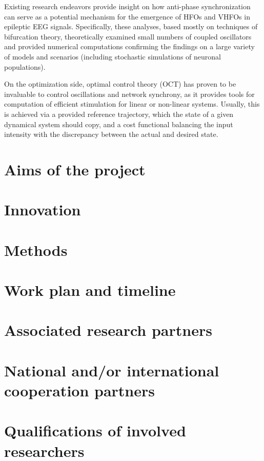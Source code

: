 \documentclass[a4paper,11pt]{scrartcl}
\begin{document}
Existing research endeavors provide insight on how anti-phase synchronization can serve as a potential mechanism for the emergence of HFOs and VHFOs in epileptic EEG signals. Specifically, these analyses, based mostly on techniques of bifurcation theory, theoretically examined small numbers of coupled oscillators and provided numerical computations confirming the findings on a large variety of models and scenarios (including stochastic simulations of neuronal populations).

On the optimization side, optimal control theory (OCT) has proven to be invaluable to control oscillations and network synchrony, as it provides tools for computation of efficient stimulation for linear or non-linear systems. Usually, this is achieved via a provided reference trajectory, which the state of a given dynamical system should copy, and a cost functional balancing the input intensity with the discrepancy between the actual and desired state.

\section{Aims of the project}\label{sec:aims}

\section{Innovation}\label{sec:innovation}

\section{Methods}\label{sec:methods}

\section{Work plan and timeline}\label{sec:workplan}

\section{Associated research partners}\label{sec:partners}

\section{National and/or international cooperation partners}\label{sec:cooperations}


\section{Qualifications of involved researchers}\label{sec:qualifications}
\end{document}

